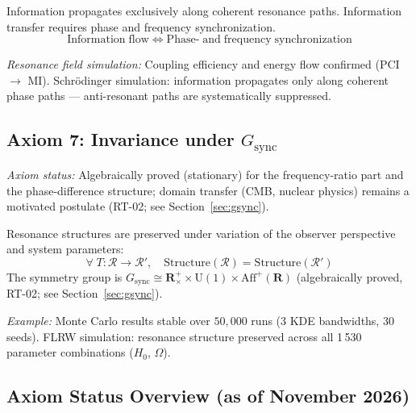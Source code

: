 \documentclass[12pt]{iopart}
\providecommand{\mathbb}[1]{\mathbf{#1}}
\begin{document}
	Information propagates exclusively along coherent
	resonance paths. Information transfer requires
	phase and frequency synchronization.
	\begin{equation}
		\mathrm{Information\;flow} \iff
		\mathrm{Phase\textrm{-}\;and\;frequency\;synchronization}
		\label{eq:information}
	\end{equation}
	
	\textit{Resonance field simulation:} Coupling efficiency
	and energy flow confirmed (PCI $\to$ MI).
	Schrödinger simulation: information propagates
	only along coherent phase paths — anti-resonant
	paths are systematically suppressed.
	
	\subsection{Axiom 7: Invariance under $G_{\mathrm{sync}}$}
	
	\textit{Axiom status:} Algebraically proved (stationary)
	for the frequency-ratio part and the phase-difference
	structure; domain transfer (CMB, nuclear physics)
	remains a motivated postulate
	(RT-02; see Section~\ref{sec:gsync}).
	
	Resonance structures are preserved under variation of
	the observer perspective and system parameters:
	\begin{equation}
		\forall\; T : \mathcal{R} \to \mathcal{R}', \quad
		\mathrm{Structure}(\mathcal{R})
		= \mathrm{Structure}(\mathcal{R}')
		\label{eq:invariance}
	\end{equation}
	The symmetry group is
	$G_{\mathrm{sync}} \cong \mathbb{R}^+_\times \times \mathrm{U}(1)
	\times \mathrm{Aff}^+(\mathbb{R})$ (algebraically proved,
	RT-02; see Section~\ref{sec:gsync}).
	
	\textit{Example:} Monte Carlo results stable over
	$50{,}000$ runs (3 KDE bandwidths, 30 seeds).
	FLRW simulation: resonance structure preserved across
	all 1\,530 parameter combinations ($H_0$, $\Omega$).
	
	\subsection{Axiom Status Overview (as of November 2026)}
	\label{sec:axiom_status}
	
\end{document}
